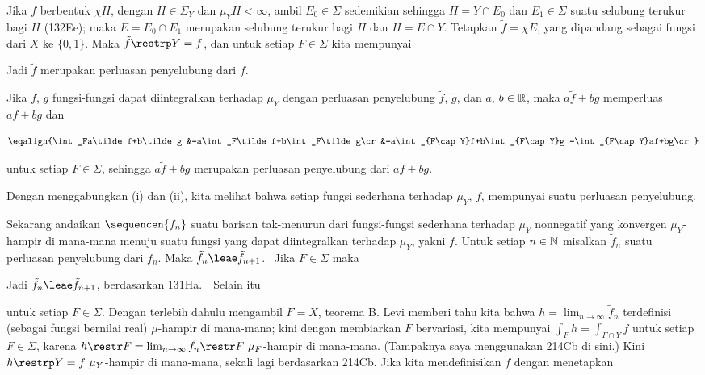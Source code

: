 {\medskip

 Jika $f$ berbentuk $\chi H$, dengan $H\in\Sigma_Y$ dan
$\mu_YH<\infty$, ambil $E_0\in\Sigma$ sedemikian sehingga $H=Y\cap E_0$
dan $E_1\in\Sigma$ suatu selubung terukur bagi $H$ (132Ee);   maka
$E=E_0\cap E_1$ merupakan selubung terukur bagi $H$ dan $H=E\cap Y$.
Tetapkan $\tilde f=\chi E$, yang dipandang sebagai fungsi dari $X$ ke
$\{0,1\}$.   Maka $\tilde f\restrp Y=f$, dan untuk setiap $F\in\Sigma$
kita mempunyai


\noindent Jadi $\tilde f$ merupakan perluasan penyelubung dari $f$.

\medskip

 Jika $f$, $g$ fungsi-fungsi dapat diintegralkan terhadap $\mu_Y$
dengan perluasan penyelubung $\tilde f$, $\tilde g$, dan $a$,
$b\in\Bbb R$, maka $a\tilde f+b\tilde g$ memperluas $af+bg$ dan

$$\eqalign{\int_Fa\tilde f+b\tilde g
&=a\int_F\tilde f+b\int_F\tilde g\cr
&=a\int_{F\cap Y}f+b\int_{F\cap Y}g
=\int_{F\cap Y}af+bg\cr}$$

\noindent untuk setiap $F\in\Sigma$, sehingga $a\tilde f+b\tilde g$
merupakan perluasan penyelubung dari $af+bg$.

\medskip

 Dengan menggabungkan (i) dan (ii), kita melihat bahwa
setiap fungsi sederhana terhadap $\mu_Y$, $f$, mempunyai suatu perluasan
penyelubung.

\medskip

 Sekarang andaikan $\sequencen{f_n}$ suatu barisan
tak-menurun dari fungsi-fungsi sederhana terhadap $\mu_Y$ nonnegatif yang konvergen
$\mu_Y$-hampir di mana-mana menuju suatu fungsi yang
dapat diintegralkan terhadap $\mu_Y$, yakni $f$.   Untuk setiap $n\in\Bbb N$ misalkan
$\tilde f_n$ suatu perluasan penyelubung dari $f_n$. Maka
$\tilde f_n\leae\tilde f_{n+1}$.   \Prf\ Jika $F\in\Sigma$ maka


\noindent Jadi $\tilde f_n\leae\tilde f_{n+1}$, berdasarkan 131Ha.\
\QeD\   Selain itu


\noindent untuk setiap $F\in\Sigma$.   Dengan terlebih dahulu mengambil
$F=X$, teorema B. Levi memberi tahu kita bahwa
$h=\lim_{n\to\infty}\tilde f_n$ terdefinisi (sebagai fungsi bernilai
real) $\mu$-hampir di mana-mana;  kini dengan membiarkan $F$ bervariasi,
kita mempunyai $\int_Fh=\int_{F\cap Y}f$ untuk setiap $F\in\Sigma$,
karena $h\restr F=\lim_{n\to\infty}\tilde f_n\restr F\,\,\mu_F$-hampir di mana-mana.
(Tampaknya saya menggunakan 214Cb di sini.)   Kini
$h\restrp Y=f\,\,\mu_Y$-hampir di mana-mana, sekali lagi berdasarkan 214Cb.   Jika kita
mendefinisikan $\tilde f$ dengan menetapkan

}
